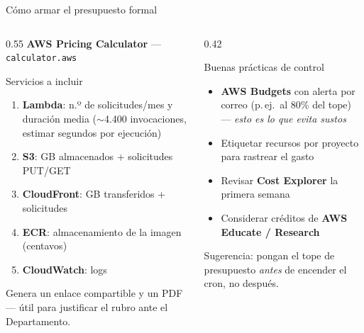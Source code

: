 \documentclass[10pt,aspectratio=169]{beamer}
\begin{document}
\begin{frame}{Cómo armar el presupuesto formal}
  \begin{columns}[T]
    \begin{column}{0.55\textwidth}
      \textbf{AWS Pricing Calculator} --- \texttt{calculator.aws}
      \begin{block}{Servicios a incluir}
        \small
        \begin{enumerate}\small
          \item \textbf{Lambda}: n.º de solicitudes/mes y duración media
                ($\sim$4.400 invocaciones, estimar segundos por ejecución)
          \item \textbf{S3}: GB almacenados + solicitudes PUT/GET
          \item \textbf{CloudFront}: GB transferidos + solicitudes
          \item \textbf{ECR}: almacenamiento de la imagen (centavos)
          \item \textbf{CloudWatch}: logs
        \end{enumerate}
      \end{block}
      \small
      Genera un enlace compartible y un PDF --- útil para justificar el rubro
      ante el Departamento.
    \end{column}
    \begin{column}{0.42\textwidth}
      \begin{block}{Buenas prácticas de control}
        \small
        \begin{itemize}\small
          \item \textbf{AWS Budgets} con alerta por correo (p.\,ej.\ al 80\%
                del tope) --- \emph{esto es lo que evita sustos}
          \item Etiquetar recursos por proyecto para rastrear el gasto
          \item Revisar \textbf{Cost Explorer} la primera semana
          \item Considerar créditos de \textbf{AWS Educate / Research}
        \end{itemize}
      \end{block}
      \footnotesize
      \textcolor{warnred}{Sugerencia:} pongan el tope de presupuesto
      \emph{antes} de encender el cron, no después.
    \end{column}
  \end{columns}
\end{frame}
\end{document}
